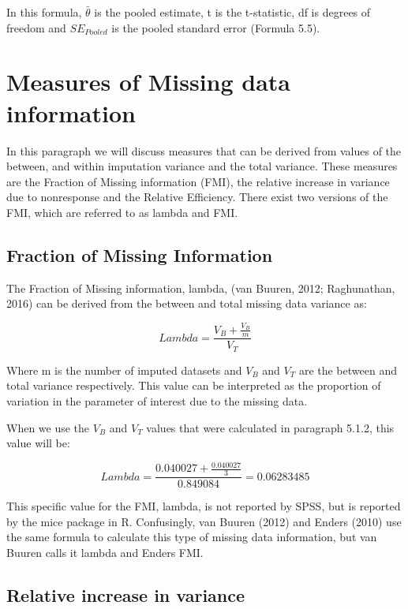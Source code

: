 \documentclass[]{book}
\theoremstyle{definition}
\theoremstyle{definition}
\theoremstyle{definition}
\theoremstyle{remark}
\begin{document}
In this formula, \(\bar{\theta}\) is the pooled estimate, t is the
t-statistic, df is degrees of freedom and \(SE_{Pooled}\) is the pooled
standard error (Formula 5.5).

\section{Measures of Missing data
information}\label{measures-of-missing-data-information}

In this paragraph we will discuss measures that can be derived from
values of the between, and within imputation variance and the total
variance. These measures are the Fraction of Missing information (FMI),
the relative increase in variance due to nonresponse and the Relative
Efficiency. There exist two versions of the FMI, which are referred to
as lambda and FMI.

\subsection{Fraction of Missing
Information}\label{fraction-of-missing-information}

The Fraction of Missing information, lambda, (van Buuren, 2012;
Raghunathan, 2016) can be derived from the between and total missing
data variance as:

\begin{equation}
Lambda = \frac{V_B + \frac{V_B}{m}}{V_T}
  \label{eq:lambda}
\end{equation}

Where m is the number of imputed datasets and \({V_B}\) and \({V_T}\)
are the between and total variance respectively. This value can be
interpreted as the proportion of variation in the parameter of interest
due to the missing data.

When we use the \({V_B}\) and \({V_T}\) values that were calculated in
paragraph 5.1.2, this value will be:

\[Lambda = \frac{0.040027 + \frac{0.040027}{3}}{0.849084}=0.06283485\]

This specific value for the FMI, lambda, is not reported by SPSS, but is
reported by the mice package in R. Confusingly, van Buuren (2012) and
Enders (2010) use the same formula to calculate this type of missing
data information, but van Buuren calls it lambda and Enders FMI.

\subsection{Relative increase in
variance}\label{relative-increase-in-variance}
\end{document}
